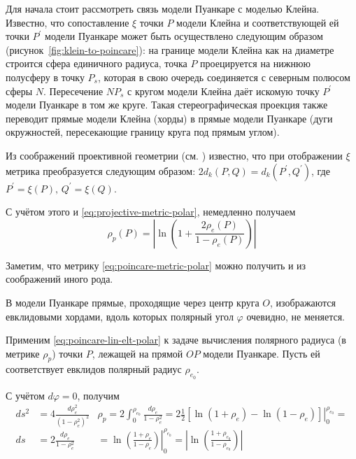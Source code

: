 \documentclass{article}
\numberwithin{equation}{section}
\renewcommand{\phi}{\varphi}
\providecommand{\abs}[1]{\left \lvert{#1}\right \rvert}
\begin{document}


Для начала стоит рассмотреть связь модели Пуанкаре с моделью Клейна.
Известно, что сопоставление $\xi$ точки $P$ модели Клейна и
соответствующей ей точки $P^\prime$ модели Пуанкаре может быть
осуществлено следующим образом (рисунок \ref{fig:klein-to-poincare}):
на границе модели Клейна как на диаметре строится сфера единичного
радиуса, точка $P$ проецируется на нижнюю полусферу в точку $P_s$,
которая в свою очередь соединяется с северным полюсом сферы $N$.
Пересечение $NP_s$ с кругом модели Клейна даёт искомую точку
$P^\prime$ модели Пуанкаре в том же круге. Такая стереографическая
проекция также переводит прямые модели Клейна (хорды) в прямые модели
Пуанкаре (дуги окружностей, пересекающие границу круга под прямым
углом).



Из соображений проективной геометрии (см. \cite{prasolov04}) известно,
что при отображении $\xi$ метрика преобразуется следующим образом:
$2d_k(P,Q) = d_k(P^\prime, Q^\prime)$, где $P^\prime=\xi(P),\,Q^\prime=\xi(Q)$.

С учётом этого и \eqref{eq:projective-metric-polar}, немедленно получаем
\begin{equation}\label{eq:poincare-metric-polar}
 \rho_p(P) = \abs{\ln\left(1+\frac{2\rho_e(P)}{1-\rho_e(P)}\right)}  
\end{equation}

Заметим, что метрику \eqref{eq:poincare-metric-polar} можно
получить и из соображений иного рода.

В модели Пуанкаре прямые, проходящие через центр круга $O$,
изображаются евклидовыми хордами, вдоль которых полярный угол $\phi$
очевидно, не меняется.

Применим \eqref{eq:poincare-lin-elt-polar} к задаче вычисления
полярного радиуса (в метрике $\rho_p$) точки $P$, лежащей на прямой
$OP$ модели Пуанкаре. Пусть ей соответствует евклидов полярный радиус
$\rho_{e_0}$.

С учётом $d\phi=0$, получим
\begin{subequations}
  \begin{equation*}
    \begin{split}
      ds^2&=4\frac{d\rho_e^2}{(1-\rho_e^2)^2} \\
      ds &= 2\frac{d\rho_e}{1-\rho_e^2} \\
    \end{split}
  \end{equation*}
  \begin{multline*}
    \rho_p = 2\int_0^{\rho_{e_0}} \frac{d\rho_e}{1-\rho_e^2} =
     2 \frac{1}{2} \left . \left [ \ln(1+\rho_e) - \ln(1-\rho_e)
       \right ] \right \rvert_0^{\rho_{e_0}} = \\
     = \left . \ln{\left( \frac{1+\rho_e}{1-\rho_e} \right)} \right
     \rvert_0^{\rho_{e_0}} =
     \abs{ \ln{\left(\frac{1+\rho_{e_0}}{1-\rho_{e_0}} \right)}}
  \end{multline*}
\end{subequations}
\end{document}
